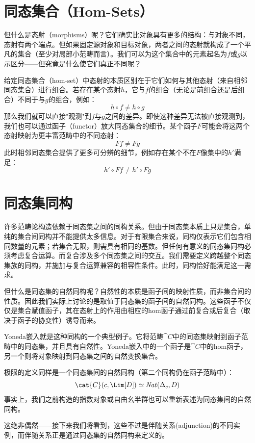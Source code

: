 \section{同态集合（Hom-Sets）}

但什么是态射（morphisms）呢？它们确实比对象具有更多的结构：与对象不同，态射有两个端点。但如果固定源对象和目标对象，两者之间的态射就构成了一个平凡的集合（至少对局部小范畴而言）。我们可以为这个集合中的元素起名为$f$或$g$以示区分——但究竟是什么使它们真正不同呢？

给定同态集合（hom-set）中态射的本质区别在于它们如何与其他态射（来自相邻同态集合）进行组合。若存在某个态射$h$，它与$f$的组合（无论是前组合还是后组合）不同于与$g$的组合，例如：
$$h \circ f \neq h \circ g$$
那么我们就可以直接"观测"到$f$与$g$之间的差异。即使这种差异无法被直接观测到，我们也可以通过函子（functor）放大同态集合的细节。某个函子$F$可能会将这两个态射映射为更丰富范畴中的不同态射：
$$F f \neq F g$$
此时相邻同态集合提供了更多可分辨的细节，例如存在某个不在$F$像集中的$h'$满足：
$$h' \circ F f \neq h' \circ F g$$

\section{同态集同构}

许多范畴论构造依赖于同态集之间的同构关系。但由于同态集本质上只是集合，单纯的集合间同构并不能提供太多信息。对于有限集合来说，同构仅表示它们包含相同数量的元素；若集合无限，则需具有相同的基数。但任何有意义的同态集同构必须考虑复合运算。而复合涉及多个同态集之间的交互。我们需要定义跨越整个同态集族的同构，并施加与复合运算兼容的相容性条件。此时，同构恰好能满足这一需求。

但什么是同态集的自然同构呢？自然性的本质是函子间的映射性质，而非集合间的性质。因此我们实际上讨论的是取值于同态集的函子间的自然同构。这些函子不仅仅是集合赋值函子，其在态射上的作用由相应的hom函子通过前复合或后复合（取决于函子的协变性）诱导而来。

Yoneda嵌入就是这种同构的一个典型例子。它将范畴$\cat{C}$中的同态集映射到函子范畴中的同态集，并且具有自然性。Yoneda嵌入中的一个函子是$\cat{C}$中的hom函子，另一个则将对象映射到同态集之间的自然变换集合。

极限的定义同样是一个同态集间的自然同构（第二个同构仍在函子范畴中）：
$$\cat{C}(c, \Lim[D]) \simeq \mathit{Nat}(\Delta_c, D)$$
事实上，我们之前构造的指数对象或自由幺半群也可以重新表述为同态集间的自然同构。

这绝非偶然——接下来我们将看到，这些不过是伴随关系(adjunction)的不同实例，而伴随关系正是通过同态集的自然同构来定义的。

